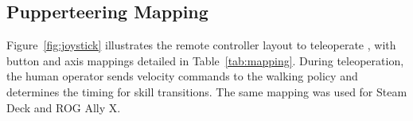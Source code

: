 \subsection{Pupperteering Mapping}
\label{sec:joystick}






Figure~\ref{fig:joystick} illustrates the remote controller layout to teleoperate \system, with button and axis mappings detailed in Table~\ref{tab:mapping}. During teleoperation, the human operator sends velocity commands to the walking policy and determines the timing for skill transitions. The same mapping was used for Steam Deck and ROG Ally X.
